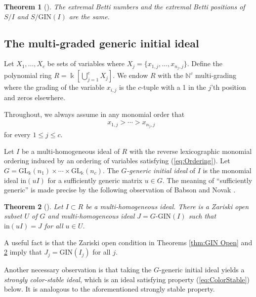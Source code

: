 \documentclass[a4paper, 10pt, reqno, english, ones]{amsart}  %
\newtheorem{theorem}{Theorem}[section]
\theoremstyle{definition}
\theoremstyle{remark}
\begin{document}
\begin{theorem}[\cite{bayer1999extremal}]\label{thm:GINextremalBettEq}
    The extremal Betti numbers and the extremal Betti positions of $S/I$ and $S/\textrm{GIN}(I)$ are the same.
\end{theorem}

\subsection{The multi-graded generic initial ideal}\label{sec:multi GIN}

Let $X_1,\dots,X_c$ be sets of variables where $X_j=\{x_{1,j},\dots,x_{n_j,j}\}$. Define the polynomial ring $R=\Bbbk [\bigcup_{j=1}^c X_j]$. We endow $R$ with the $\mathbb{N}^{c}$ multi-grading where the grading of the variable $x_{i,j}$ is the $c$-tuple with a 1 in the $j$'th position and zeros elsewhere.

Throughout, we always assume in any monomial order that 
\begin{align}\label{eq:Ordering}
    & x_{1,j}>\cdots>x_{n_j,j}
\end{align}
for every $1\leq j\leq c$.

Let $I$ be a multi-homogeneous ideal of $R$ with the reverse lexicographic monomial ordering induced by an ordering of variables satisfying (\ref{eq:Ordering}). Let $G= \textrm{GL}_\Bbbk (n_1)\times \cdots \times\textrm{GL}_\Bbbk (n_c)$. The \textit{$G$-generic initial ideal} of $I$ is the monomial ideal $\textrm{in}(uI)$ for a sufficiently generic matrix $u\in G$. The meaning of ``sufficiently generic'' is made precise by the following observation of Babson and Novak \cite{Babson2004Face}.

\begin{theorem}[\cite{Babson2004Face}]\label{thm:color zariski open}
    Let $I\subset R$ be a multi-homogeneous ideal. There is a Zariski open subset $U$ of $G$ and multi-homogeneous ideal $J=\textrm{$G$-GIN}(I)$ such that $\textrm{in}(uI)=J$ for all $u\in U$.
\end{theorem}

A useful fact is that the Zariski open condition in Theorems \ref{thm:GIN Open} and \ref{thm:color zariski open} imply that $J_j=\textrm{GIN}(I_j)$ for all $j$. 

Another necessary observation is that taking the $G$-generic initial ideal yields a \textit{strongly color-stable ideal}, which is an ideal satisfying property (\ref{eq:ColorStable}) below. It is analogous to the aforementioned strongly stable property.
\end{document}
